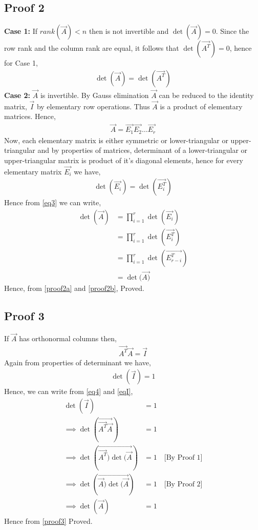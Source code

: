 \documentclass[journal,12pt,twocolumn]{IEEEtran}
\begin{document}
\subsection{Proof 2}
\textbf{Case 1:} If $rank(\vec{A})<n$ then  is not invertible and $\det(\vec{A}) = 0$. Since the row rank and the
column rank are equal, it follows that $\det(\vec{A^T}) = 0$, hence for Case 1, 
\begin{align}
    \det(\vec{A}) = \det(\vec{A^T})\label{proof2a}
\end{align}
\textbf{Case 2:} $\vec{A}$ is invertible. By Gauss elimination $\vec{A}$ can be reduced to the identity matrix, $\vec{I}$ by elementary row operations. Thus $\vec{A}$ is a product of elementary matrices. Hence,
\begin{align}
\vec{A} = \vec{E_1}\vec{E_2}\dots\vec{E_r}\label{eq3}
\end{align}
Now, each elementary matrix is either symmetric or lower-triangular or upper-triangular and by properties of matrices, determinant of a lower-triangular or upper-triangular matrix is product of it's diagonal elements, hence for every elementary matrix $\vec{E_i}$ we have,
\begin{align}
\det(\vec{E_i}) = \det(\vec{E_i^T}) 
\end{align}
Hence from \eqref{eq3} we can write,
\begin{align}
\det(\vec{A}) &= \prod_{i=1}^{r} \det(\vec{E_i})\\
&= \prod_{i=1}^{r} \det(\vec{E_i^T})\\
&= \prod_{i=1}^{r} \det(\vec{E_{r-i}^T})\\
&= \det(\vec{A)}\label{proof2b}
\end{align}
Hence, from \eqref{proof2a} and \eqref{proof2b}, Proved.
\subsection{Proof 3}
If $\vec{A}$ has orthonormal columns then,
\begin{align}
\vec{A^T}\vec{A} = \vec{I}\label{eq4}
\end{align}
Again from properties of determinant we have,
\begin{align}
    \det(\vec{I}) = 1\label{eqI}
\end{align}
Hence, we can write from \eqref{eq4} and \eqref{eqI},
\begin{align}
\det(\vec{I}) &= 1\\
\implies\det(\vec{\vec{A^T}\vec{A}}) &= 1\\
\implies\det(\vec{\vec{A^T})\det(\vec{A}}) &= 1 \quad{\text{[By Proof 1]}}\\
\implies\det(\vec{\vec{A})\det(\vec{A}}) &= 1 \quad{\text{[By Proof 2]}}\\
\implies\det(\vec{A}) &= 1\label{proof3}
\end{align}
Hence from \eqref{proof3} Proved.
\end{document}
